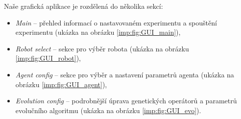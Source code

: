 Naše grafická aplikace je rozdělená do několika sekcí:

\begin{itemize}
    \item \emph{Main} -- přehled informací o nastavovaném experimentu a
        spouštění experimentu (ukázka na obrázku \ref{imp:fig:GUI_main}),
    \item \emph{Robot select} -- sekce pro výběr robota (ukázka na obrázku
        \ref{imp:fig:GUI_robot}),
    \item \emph{Agent config} -- sekce pro výběr a nastavení parametrů agenta
        (ukázka na obrázku \ref{imp:fig:GUI_agent}),
    \item \emph{Evolution config} -- podrobnější úprava genetických operátorů a
        parametrů evolučního algoritmu (ukázka na obrázku \ref{imp:fig:GUI_evo}).
\end{itemize}

